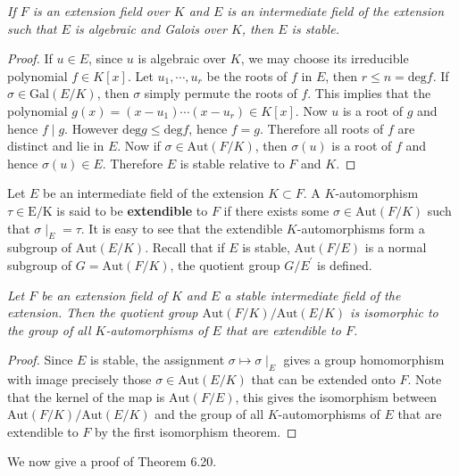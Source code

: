 \begin{lemma}\em
If $F$ is an extension field over $K$ and $E$ is an intermediate field of the extension such that $E$ is algebraic and Galois over $K$, then $E$ is stable.
\end{lemma}
\begin{proof}
If $u\in E$, since $u$ is algebraic over $K$, we may choose its irreducible polynomial $f\in K[x]$. Let $u_1,\cdots,u_r$ be the roots of $f$ in $E$, then $r\le n=\mathrm{deg}f$. If $\sigma\in\mathrm{Gal}(E/K)$, then $\sigma$ simply permute the roots of $f$. This implies that the polynomial $g(x)=(x-u_1)\cdots(x-u_r)\in K[x]$. Now $u$ is a root of $g$ and hence $f\mid g$. However $\mathrm{deg}g\le\mathrm{deg}f$, hence $f=g$. Therefore all roots of $f$ are distinct and lie in $E$. Now if $\sigma\in\mathrm{Aut}(F/K)$, then $\sigma(u)$ is a root of $f$ and hence $\sigma(u)\in E$. Therefore $E$ is stable relative to $F$ and $K$.
\end{proof}
Let $E$ be an intermediate field of the extension $K\subset F$. A $K$-automorphism $\tau\in\mathrm{E/K}$ is said to be \textbf{extendible} to $F$ if there exists some $\sigma\in\mathrm{Aut}(F/K)$ such that $\sigma\mid_E=\tau$. It is easy to see that the extendible $K$-automorphisms form a subgroup of $\mathrm{Aut}(E/K)$. Recall that if $E$ is stable, $\mathrm{Aut}(F/E)$ is a normal subgroup of $G=\mathrm{Aut}(F/K)$, the quotient group $G/E^\prime$ is defined.
\begin{lemma}\em
Let $F$ be an extension field of $K$ and $E$ a stable intermediate field of the extension. Then the quotient group $\mathrm{Aut}(F/K)/\mathrm{Aut}(E/K)$ is isomorphic to the group of all $K$-automorphisms of $E$ that are extendible to $F$.
\end{lemma}
\begin{proof}
Since $E$ is stable, the assignment $\sigma\mapsto\sigma\mid_E$ gives a group homomorphism with image precisely those $\sigma\in\mathrm{Aut}(E/K)$ that can be extended onto $F$. Note that the kernel of the map is $\mathrm{Aut}(F/E)$, this gives the isomorphism between $\mathrm{Aut}(F/K)/\mathrm{Aut}(E/K)$ and the group of all $K$-automorphisms of $E$ that are extendible to $F$ by the first isomorphism theorem.
\end{proof}
We now give a proof of Theorem 6.20.
